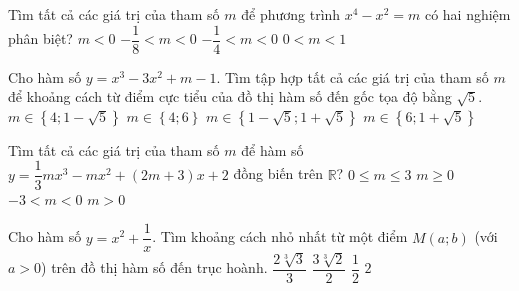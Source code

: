 \begin{ex}%
Tìm tất cả các giá trị của tham số $m$ để phương trình $x^4-x^2=m$ có hai nghiệm phân biệt?
\choice
{$m<0$}
{$-\dfrac{1}{8}< m<0$}
{\True$-\dfrac{1}{4}< m<0$}
{$0<m<1$}
\end{ex} 
\begin{ex}%
Cho hàm số $y=x^3-3x^2+m-1$. Tìm tập hợp tất cả các giá trị của tham số $m$ để khoảng cách từ điểm cực tiểu của đồ thị hàm số đến gốc tọa độ bằng $\sqrt{5}$.
\choice
{$m \in \left\{ {4;1 - \sqrt 5 } \right\}$}
{\True$m \in \left\{ {4;6 } \right\}$}
{$m \in \left\{ {1 - \sqrt 5;1 + \sqrt 5 } \right\}$}
{$m \in \left\{ {6;1 + \sqrt 5 } \right\}$}
\end{ex} 
\begin{ex}%
Tìm tất cả các giá trị của tham số $m$ để hàm số $y=\dfrac{1}{3}mx^3-mx^2+(2m+3)x+2$ đồng biến trên $\mathbb{R}$?
\choice
{$0\leq m \leq 3$}
{\True$m\geq 0$}
{$-3<m<0$}
{$m>0$}
\end{ex} 
\begin{ex}%
Cho hàm số $y=x^2+\dfrac{1}{x}$. Tìm khoảng cách nhỏ nhất từ một điểm $M(a;b)$ (với $a>0$) trên đồ thị hàm số  đến trục hoành.
\choice
{$\dfrac{2\sqrt[3]{3}}{3}$}
{\True$\dfrac{3\sqrt[3]{2}}{2}$}
{$\dfrac{1}{2}$}
{$2$}
\end{ex} 
